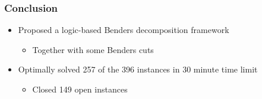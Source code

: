 \documentclass{beamer}
\begin{document}
\begin{frame}
\frametitle{Conclusion}
\begin{itemize}
	\item Proposed a logic-based Benders decomposition framework\vspace{2mm}
	\begin{itemize}
		\item Together with some Benders cuts\vspace{3mm}
	\end{itemize}\pause
	\item Optimally solved 257 of the 396 instances in 30 minute time limit\vspace{2mm}
	\begin{itemize}
		\item {\color{red} Closed 149 open instances}
	\end{itemize}
\end{itemize}
\end{frame}
\end{document}
